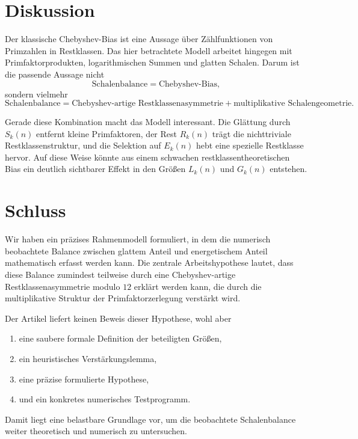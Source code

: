 \documentclass[11pt,a4paper]{article}
\theoremstyle{definition}
\theoremstyle{remark}
\begin{document}
	\section{Diskussion}
	
	Der klassische Chebyshev-Bias ist eine Aussage über Zählfunktionen von Primzahlen in
	Restklassen. Das hier betrachtete Modell arbeitet hingegen mit Primfaktorprodukten,
	logarithmischen Summen und glatten Schalen. Darum ist die passende Aussage nicht
	\[
	\text{Schalenbalance}=\text{Chebyshev-Bias},
	\]
	sondern vielmehr
	\[
	\text{Schalenbalance}
	=
	\text{Chebyshev-artige Restklassenasymmetrie}
	+
	\text{multiplikative Schalengeometrie}.
	\]
	
	Gerade diese Kombination macht das Modell interessant. Die Glättung durch \(S_k(n)\) entfernt
	kleine Primfaktoren, der Rest \(R_k(n)\) trägt die nichttriviale Restklassenstruktur, und die
	Selektion auf \(E_k(n)\) hebt eine spezielle Restklasse hervor. Auf diese Weise könnte aus einem
	schwachen restklassentheoretischen Bias ein deutlich sichtbarer Effekt in den Größen
	\(L_k(n)\) und \(G_k(n)\) entstehen.
	
	\section{Schluss}
	
	Wir haben ein präzises Rahmenmodell formuliert, in dem die numerisch beobachtete Balance zwischen
	glattem Anteil und energetischem Anteil mathematisch erfasst werden kann. Die zentrale
	Arbeitshypothese lautet, dass diese Balance zumindest teilweise durch eine Chebyshev-artige
	Restklassenasymmetrie modulo \(12\) erklärt werden kann, die durch die multiplikative Struktur
	der Primfaktorzerlegung verstärkt wird.
	
	Der Artikel liefert keinen Beweis dieser Hypothese, wohl aber
	\begin{enumerate}
		\item eine saubere formale Definition der beteiligten Größen,
		\item ein heuristisches Verstärkungslemma,
		\item eine präzise formulierte Hypothese,
		\item und ein konkretes numerisches Testprogramm.
	\end{enumerate}
	
	Damit liegt eine belastbare Grundlage vor, um die beobachtete Schalenbalance weiter theoretisch
	und numerisch zu untersuchen.
	
\end{document}
